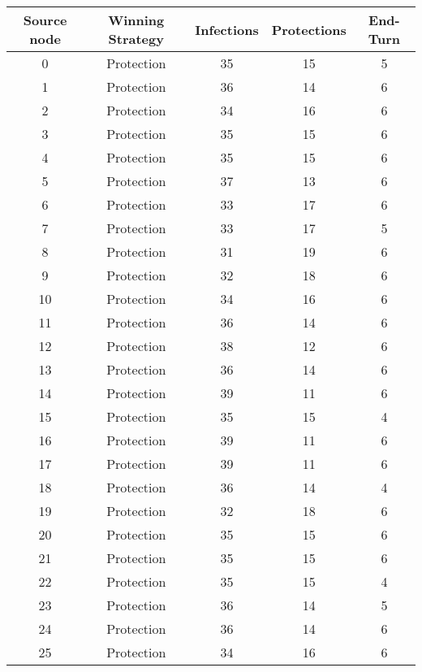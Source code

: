 \documentclass[results.tex]{subfiles}
\begin{document}
\begin{center}
  \begin{tabular}{| c || c | c | c | c |}
    \hline
    {\bfseries Source node} & {\bfseries Winning Strategy} & {\bfseries Infections} & {\bfseries Protections} & {\bfseries End-Turn} \\  %
    \hline\hline
    0 & Protection & 35 & 15 & 5 \\ 
    \hline
    1 & Protection & 36 & 14 & 6 \\ 
    \hline
    2 & Protection & 34 & 16 & 6 \\ 
    \hline
    3 & Protection & 35 & 15 & 6 \\ 
    \hline
    4 & Protection & 35 & 15 & 6 \\ 
    \hline
    5 & Protection & 37 & 13 & 6 \\ 
    \hline
    6 & Protection & 33 & 17 & 6 \\ 
    \hline
    7 & Protection & 33 & 17 & 5 \\ 
    \hline
    8 & Protection & 31 & 19 & 6 \\ 
    \hline
    9 & Protection & 32 & 18 & 6 \\ 
    \hline
    10 & Protection & 34 & 16 & 6 \\ 
    \hline
    11 & Protection & 36 & 14 & 6 \\ 
    \hline
    12 & Protection & 38 & 12 & 6 \\ 
    \hline
    13 & Protection & 36 & 14 & 6 \\ 
    \hline
    14 & Protection & 39 & 11 & 6 \\ 
    \hline
    15 & Protection & 35 & 15 & 4 \\ 
    \hline
    16 & Protection & 39 & 11 & 6 \\ 
    \hline
    17 & Protection & 39 & 11 & 6 \\ 
    \hline
    18 & Protection & 36 & 14 & 4 \\ 
    \hline
    19 & Protection & 32 & 18 & 6 \\ 
    \hline
    20 & Protection & 35 & 15 & 6 \\ 
    \hline
    21 & Protection & 35 & 15 & 6 \\ 
    \hline
    22 & Protection & 35 & 15 & 4 \\ 
    \hline
    23 & Protection & 36 & 14 & 5 \\ 
    \hline
    24 & Protection & 36 & 14 & 6 \\ 
    \hline
    25 & Protection & 34 & 16 & 6 \\ 

\end{tabular}
\end{center}
\end{document}
